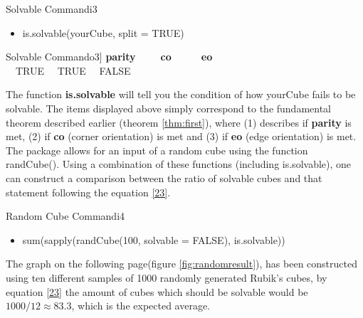 \documentclass{article}
\newcounter{theo}[section]\setcounter{theo}{0}
\begin{document}
\begin{myinput}{Solvable Command}{i3}
\begin{itemize}
\item is.solvable(yourCube, split = TRUE)
\end{itemize}
\end{myinput}
\begin{myoutput}{Solvable Command}{o3}]
  \textbf{parity}\ \ \ \ \ \textbf{co}\ \ \ \ \ \ \textbf{eo}\\
  \ \ TRUE \ \   TRUE  \ \ FALSE
\end{myoutput}

The function \textbf{is.solvable} will tell you the condition of how yourCube fails to be solvable. The items displayed above simply correspond to the fundamental theorem described earlier (theorem \ref{thm:first}), where (1) describes if \textbf{parity} is met, (2) if \textbf{co} (corner orientation) is met and (3) if \textbf{eo} (edge orientation) is met. \newline The package allows for an input of a random cube using the function randCube(). Using a combination of these functions (including is.solvable), one can construct a comparison between the ratio of solvable cubes and that statement following the equation \ref{23}.

\begin{myinput}{Random Cube Command}{i4}
\begin{itemize}
\item sum(sapply(randCube(100, solvable = FALSE), is.solvable))
\end{itemize}
\end{myinput}
The graph on the following page(figure \ref{fig:randomresult}), has been constructed using ten different samples of 1000 randomly generated Rubik's cubes, by equation \ref{23} the amount of cubes which should be solvable would be $1000/12 \approx 83.3$, which is the expected average.\newline 
\end{document}
